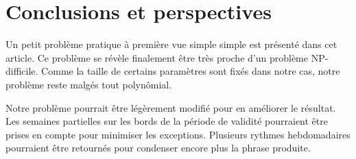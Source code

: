 \documentclass{roadef}
\begin{document}
\section{Conclusions et perspectives}

Un petit problème pratique à première vue simple simple est présenté
dans cet article. Ce problème se révèle finalement être très proche
d'un problème NP-difficile. Comme la taille de certains paramètres
sont fixés dans notre cas, notre problème reste malgés tout
polynômial.

Notre problème pourrait être légèrement modifié pour en améliorer le
résultat. Les semaines partielles sur les bords de la période de
validité pourraient être prises en compte pour minimiser les
exceptions. Plusieurs rythmes hebdomadaires pourraient être retournés
pour condenser encore plus la phrase produite.



\end{document}
